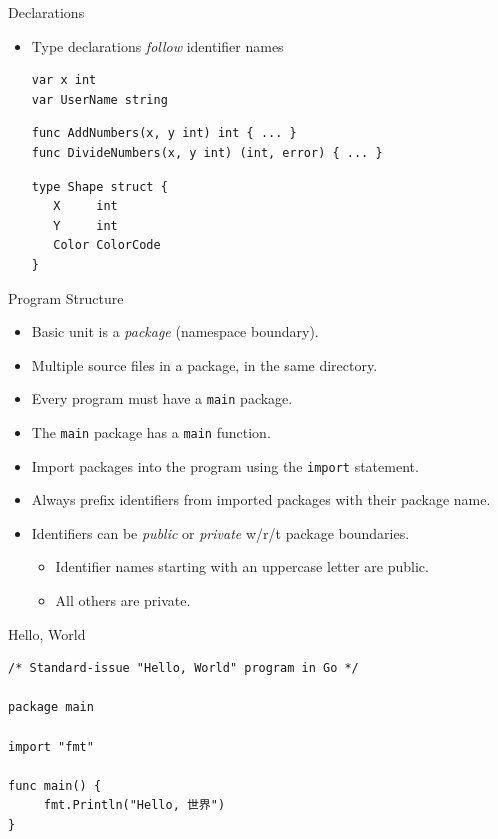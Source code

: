 \documentclass[pdf,t]{beamer}
\newcommand\z[1]{\texttt{#1}}
\newcommand\identifier[1]{{\color{green!70!black}\z{#1}}}
\newcommand\keyword[1]{{\color{blue}\z{#1}}}
\newcommand\playground[1]{\framebox{\color{gray}\z{https://go.dev/play/#1}}}
\begin{document}
\begin{frame}[fragile]{Declarations}
    \begin{itemize}
        \item Type declarations \emph{follow} identifier names
\begin{lstlisting}
var x int
var UserName string
\end{lstlisting}
\pause
\begin{lstlisting}
func AddNumbers(x, y int) int { ... }
func DivideNumbers(x, y int) (int, error) { ... }
\end{lstlisting}
\pause
\begin{lstlisting}
type Shape struct {
   X     int
   Y     int
   Color ColorCode
}
\end{lstlisting}
    \end{itemize}
\end{frame}
\begin{frame}{Program Structure}
    \begin{itemize}
        \item Basic unit is a \emph{package} (namespace boundary).\pause
        \item Multiple source files in a package, in the same directory.\pause
        \item Every program must have a \identifier{main} package.
        \item The \identifier{main} package has a \identifier{main} function.\pause
        \item Import packages into the program using the \keyword{import} statement.
        \item Always prefix identifiers from imported packages with their package name.\pause
        \item Identifiers can be \emph{public} or \emph{private} w/r/t package boundaries.\pause
            \begin{itemize}
                \item Identifier names starting with an uppercase letter are public.
                \item All others are private.
            \end{itemize}
    \end{itemize}
\end{frame}

\begin{frame}[fragile]{Hello, World}
\playground{}
\begin{lstlisting}
/* Standard-issue "Hello, World" program in Go */

package main

import "fmt"

func main() {
     fmt.Println("Hello, 世界")
}
\end{lstlisting}
\end{frame}
\end{document}
